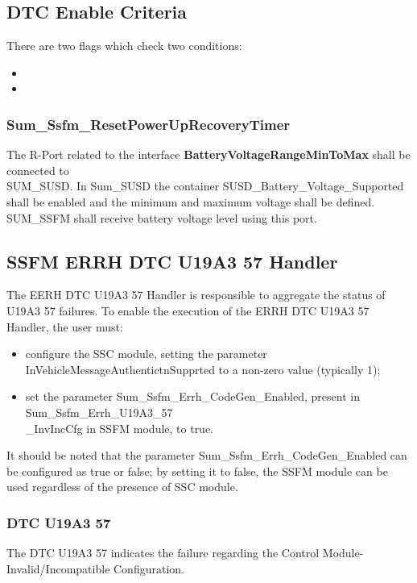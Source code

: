 \subsection{DTC Enable Criteria}
\label{subsec:DTCEnableCriteria}

There are two flags which check two conditions:
\begin{itemize}
    \item {}
	\item {}
\end{itemize}

\subsubsection{Sum\_Ssfm\_ResetPowerUpRecoveryTimer}
The R-Port related to the interface \textbf{BatteryVoltageRangeMinToMax} shall be connected to \\SUM\_SUSD. In Sum\_SUSD the container SUSD\_Battery\_Voltage\_Supported shall be enabled and the minimum and maximum voltage shall be defined. 
SUM\_SSFM shall receive battery voltage level using this port.


\subsection{SSFM ERRH DTC U19A3 57 Handler}
\label{subsec:SSFMERRHDTCU19A357Handler}
The EERH DTC U19A3 57 Handler is responsible to aggregate the status of U19A3 57 failures. 
To enable the execution of the ERRH DTC U19A3 57 Handler, the user must:
\begin{itemize} 
	\item configure the SSC module, setting the parameter InVehicleMessageAuthentictnSupprted to a non-zero value (typically 1);
	\item set the parameter Sum\_Ssfm\_Errh\_CodeGen\_Enabled, present in Sum\_Ssfm\_Errh\_U19A3\_57\\\_InvIncCfg in SSFM module, to true.
\end{itemize}
It should be noted that the parameter Sum\_Ssfm\_Errh\_CodeGen\_Enabled can be configured as true or false; by setting it to false, the SSFM module can be used regardless of the presence of SSC module.


\subsubsection{DTC  U19A3 57}
The DTC  U19A3 57 indicates the failure regarding the Control Module-Invalid/Incompatible Configuration.

